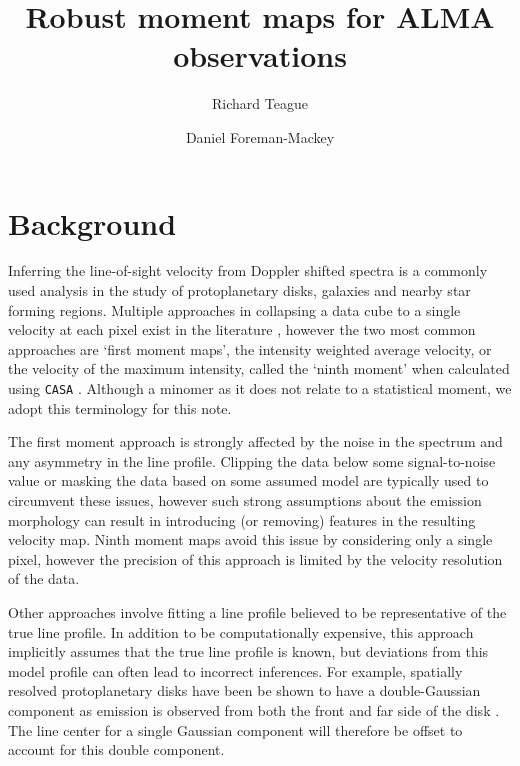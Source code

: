 \documentclass[rnaas]{aastex62}
\begin{document}
\raggedbottom\sloppy\sloppypar\frenchspacing

\title{%
Robust moment maps for ALMA observations
}

\author[0000-0003-1534-5186]{Richard Teague}

\author[0000-0002-9328-5652]{Daniel Foreman-Mackey}


\section{Background}

Inferring the line-of-sight velocity from Doppler shifted spectra is a commonly used analysis in the study of protoplanetary disks, galaxies and nearby star forming regions. Multiple approaches in collapsing a data cube to a single velocity at each pixel exist in the literature \citep[see, for example][]{deBlok:2008}, however the two most common approaches are `first moment maps', the intensity weighted average velocity, or the velocity of the maximum intensity, called the `ninth moment' when calculated using \texttt{CASA} \citep{McMullin:2007}. Although a minomer as it does not relate to a statistical moment, we adopt this terminology for this note.

The first moment approach is strongly affected by the noise in the spectrum and any asymmetry in the line profile. Clipping the data below some signal-to-noise value or masking the data based on some assumed model are typically used to circumvent these issues, however such strong assumptions about the emission morphology can result in introducing (or removing) features in the resulting velocity map. Ninth moment maps avoid this issue by considering only a single pixel, however the precision of this approach is limited by the velocity resolution of the data.

Other approaches involve fitting a line profile believed to be representative of the true line profile. In addition to be computationally expensive, this approach implicitly assumes that the true line profile is known, but deviations from this model profile can often lead to incorrect inferences. For example, spatially resolved protoplanetary disks have been be shown to have a double-Gaussian component as emission is observed from both the front and far side of the disk \citep{Rosenfeld:2013}. The line center for a single Gaussian component will therefore be offset to account for this double component.
\end{document}
